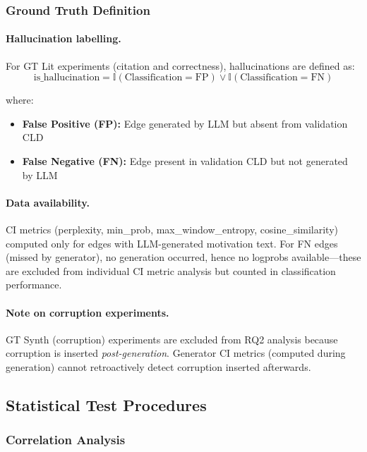 \subsubsection{Ground Truth Definition}

\paragraph{Hallucination labelling.} For GT Lit experiments (citation and correctness), hallucinations are defined as:
\begin{equation}
\text{is\_hallucination} = \mathbb{I}(\text{Classification} = \text{FP}) \lor \mathbb{I}(\text{Classification} = \text{FN})
\label{eq:halluc_def}
\end{equation}

where:
\begin{itemize}
    \item \textbf{False Positive (FP):} Edge generated by LLM but absent from validation CLD
    \item \textbf{False Negative (FN):} Edge present in validation CLD but not generated by LLM
\end{itemize}

\paragraph{Data availability.} CI metrics (perplexity, min\_prob, max\_window\_entropy, cosine\_similarity) computed only for edges with LLM-generated motivation text. For FN edges (missed by generator), no generation occurred, hence no logprobs available---these are excluded from individual CI metric analysis but counted in classification performance.

\paragraph{Note on corruption experiments.} GT Synth (corruption) experiments are excluded from RQ2 analysis because corruption is inserted \textit{post-generation}. Generator CI metrics (computed during generation) cannot retroactively detect corruption inserted afterwards.

\subsection{Statistical Test Procedures}

\subsubsection{Correlation Analysis}

